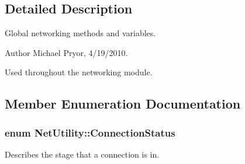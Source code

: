 \subsection{Detailed Description}
Global networking methods and variables. \begin{DoxyAuthor}{Author}
Michael Pryor, 4/19/2010.
\end{DoxyAuthor}
Used throughout the networking module. 

\subsection{Member Enumeration Documentation}
\hypertarget{class_net_utility_a7eae52138f8bd597ffc67ebf07e86b6d}{
\subsubsection[{ConnectionStatus}]{\setlength{\rightskip}{0pt plus 5cm}enum {\bf NetUtility::ConnectionStatus}}}
\label{class_net_utility_a7eae52138f8bd597ffc67ebf07e86b6d}


Describes the stage that a connection is in. 

